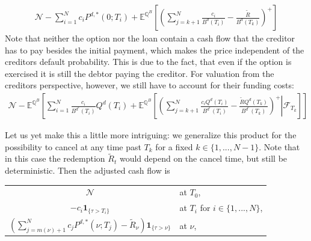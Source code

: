 \documentclass[12pt]{article}
\begin{document}
	\begin{align}\label{eq:priceofcancellableloan}
		\mathcal{N} -\sum_{i=1}^{N}c_iP^{d,*}(0;T_i) +  \mathbb{E}^{\mathbb{Q}^B}\left[\left(\sum_{j=k+1}^{N}\frac{c_i }{B^{d}(T_i)} - \frac{\tilde{R}}{B^{d}(T_k)}\right)^+\right]
	\end{align}
	Note that neither the option nor the loan contain a cash flow that the creditor has to pay besides the initial payment, which makes the price independent of the creditors default probability. This is due to the fact, that even if the option is exercised it is still the debtor paying the creditor. For valuation from the creditors perspective, however, we still have to account for their funding costs:
	\begin{align}\label{eq:valueofcancellableloancreditordefault}
		\mathcal{N} - \mathbb{E}^{\mathbb{Q}^B}\left[\sum_{i=1}^{N}\frac{c_i}{B^{d^c}(T_i)}Q^d(T_i) +  \mathbb{E}^{\mathbb{Q}^B}\left[\left.\left(\sum_{j=k+1}^{N}\frac{c_i Q^d(T_i)}{B^{d^c}(T_i)} - \frac{\tilde{R}Q^d(T_k)}{B^{d^c}(T_k)}\right)^+ \right| \mathcal{F}_{T_k}\right]\right]
	\end{align}
	
	Let us yet make this a little more intriguing: we generalize this product for the possibility to cancel at any time past $T_k$ for a fixed $k \in \{1,...,N-1\}$.
	Note that in this case the redemption $\tilde{R}_t$ would depend on the cancel time, but still be deterministic. Then the adjusted cash flow is
	
	\begin{center}
		\begin{tabular}{cl}
			$\mathcal{N}$ & at $T_0$, \\
			$-c_i\mathbf{1}_{\{\tau > T_i\}}$ 		  & at $T_i$ for $i \in \{1, ..., N\}$, \\
			$\left(\sum_{j=m(\nu)+1}^{N}c_jP^{d,*}(\nu;T_j) - \tilde{R}_\nu\right)\mathbf{1}_{\{\tau > \nu\}}$
			& at $\nu$,
		\end{tabular}
	\end{center}
	
\end{document}

